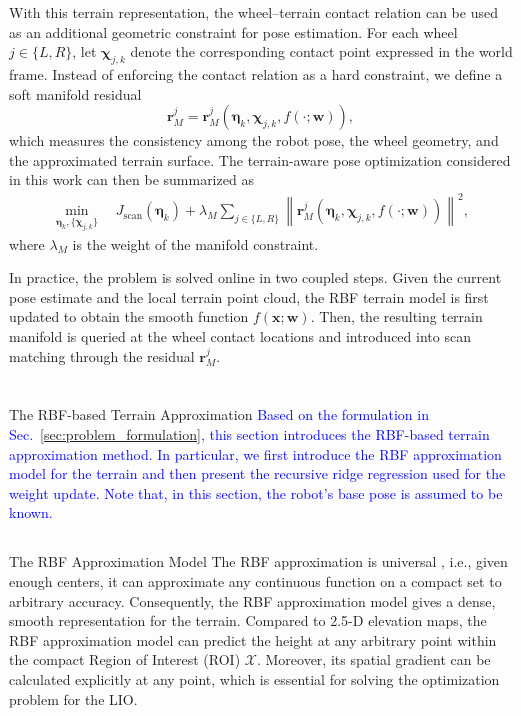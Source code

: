 \documentclass[journal,twoside,web]{ieeecolor}
\makeatletter
\newcommand{\cs}[1]{\textcolor{blue}{#1}}
\let\origsection\section
\def\section{\@ifstar\sectionstarcolor\sectioncolor}
\def\sectioncolor#1{\origsection{\textcolor{nblue}{#1}}}
\def\sectionstarcolor#1{\origsection*{#1}}
\let\origsubsection\subsection
\def\subsection{\@ifstar\subsectionstarcolor\subsectioncolorcmd}
\def\subsectioncolorcmd#1{\origsubsection{\textcolor{subsectioncolor}{#1}}}
\def\subsectionstarcolor#1{\origsubsection*{#1}}
\makeatother
\begin{document}
With this terrain representation, the wheel--terrain contact relation can be used as an additional geometric constraint for pose estimation. For each wheel $j\in\{L,R\}$, let $\bm{\chi}_{j,k}$ denote the corresponding contact point expressed in the world frame. Instead of enforcing the contact relation as a hard constraint, we define a soft manifold residual
\begin{equation}
    \mathbf{r}^{j}_{M}
    =
    \mathbf{r}^{j}_{M}
    \left(
    \bm{\eta}_k,
    \bm{\chi}_{j,k},
    f(\cdot;\mathbf{w})
    \right),
    \label{eq:problem_manifold_residual}
\end{equation}
which measures the consistency among the robot pose, the wheel geometry, and the approximated terrain surface. The terrain-aware pose optimization considered in this work can then be summarized as
\begin{equation}
\begin{aligned}
    \min_{\bm{\eta}_k,\{\bm{\chi}_{j,k}\}}
    \quad
    J_{\mathrm{scan}}(\bm{\eta}_k)
    +
    \lambda_{M}
    \sum_{j\in\{L,R\}}
    \left\|
    \mathbf{r}^{j}_{M}
    \left(
    \bm{\eta}_k,
    \bm{\chi}_{j,k},
    f(\cdot;\mathbf{w})
    \right)
    \right\|^{2},
\end{aligned}
\label{eq:problem_total_cost}
\end{equation}
where $\lambda_{M}$ is the weight of the manifold constraint.

In practice, the problem is solved online in two coupled steps. Given the current pose estimate and the local terrain point cloud, the RBF terrain model is first updated to obtain the smooth function $f(\mathbf{x};\mathbf{w})$. Then, the resulting terrain manifold is queried at the wheel contact locations and introduced into scan matching through the residual $\mathbf{r}^{j}_{M}$.




\section{The RBF-based Terrain Approximation}\label{sec:RBF_approximation}
\cs{Based on the formulation in Sec.~\ref{sec:problem_formulation}, this section introduces the RBF-based terrain approximation method. In particular, we first introduce the RBF approximation model for the terrain and then present the recursive ridge regression used for the weight update. Note that, in this section, the robot's base pose is assumed to be known.}
\subsection{The RBF Approximation Model}\label{sec: RBF_approximation_model}
The RBF approximation is universal \cite{rbf2001}, i.e., given enough centers, it can approximate any continuous function on a compact set to arbitrary accuracy.  
Consequently, the RBF approximation model gives a dense, smooth representation for the terrain.
Compared to 2.5-D elevation maps, the RBF approximation model can predict the height at any arbitrary point within the compact Region of Interest (ROI) $\mathcal{X}$.
Moreover, its spatial gradient can be calculated explicitly at any point, which is essential for solving the optimization problem for the LIO.
\end{document}
